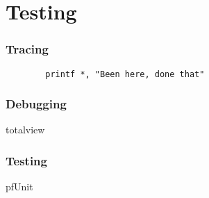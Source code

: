 \section{Testing}

\begin{frame}[fragile]
    \frametitle{Tracing}

    \begin{lstlisting}
        printf *, "Been here, done that"
    \end{lstlisting}

\end{frame}

\begin{frame}
    \frametitle{Debugging}
    totalview
\end{frame}

\begin{frame}
    \frametitle{Testing}
    pfUnit 
\end{frame}

